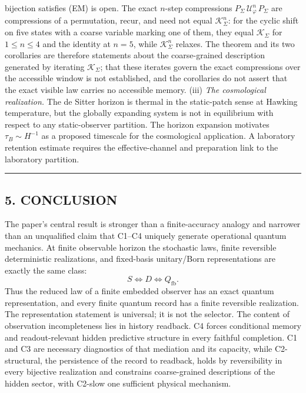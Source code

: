 \documentclass[
]{article}
\begin{document}
bijection satisfies (EM) is open. The exact \(n\)-step compressions
\(P_\Sigma\, \mathcal{U}_\varphi^n\, P_\Sigma\) are compressions of a
permutation, recur, and need not equal \(\mathcal{K}_\Sigma^n\): for the
cyclic shift on five states with a coarse variable marking one of them,
they equal \(\mathcal{K}_\Sigma\) for \(1 \leq n \leq 4\) and the
identity at \(n = 5\), while \(\mathcal{K}_\Sigma^n\) relaxes. The
theorem and its two corollaries are therefore statements about the
coarse-grained description generated by iterating
\(\mathcal{K}_\Sigma\); that these iterates govern the exact
compressions over the accessible window is not established, and the
corollaries do not assert that the exact visible law carries no
accessible memory. (iii) \emph{The cosmological realization.} The de
Sitter horizon is thermal in the static-patch sense at Hawking
temperature, but the globally expanding system is not in equilibrium
with respect to any static-observer partition. The horizon expansion
motivates \(\tau_B \sim H^{-1}\) as a proposed timescale for the
cosmological application. A laboratory retention estimate requires the
effective-channel and preparation link to the laboratory partition.

\begin{center}\rule{0.5\linewidth}{0.5pt}\end{center}

\hypertarget{conclusion}{%
\subsection{5. CONCLUSION}\label{conclusion}}

The paper's central result is stronger than a finite-accuracy analogy
and narrower than an unqualified claim that C1--C4 uniquely generate
operational quantum mechanics. At finite observable horizon the
stochastic laws, finite reversible deterministic realizations, and
fixed-basis unitary/Born representations are exactly the same class: \[
S\iff D\iff Q_{\mathrm{fb}}.
\] Thus the reduced law of a finite embedded observer has an exact
quantum representation, and every finite quantum record has a finite
reversible realization. The representation statement is universal; it is
not the selector. The content of observation incompleteness lies in
history readback. C4 forces conditional memory and readout-relevant
hidden predictive structure in every faithful completion. C1 and C3 are
necessary diagnostics of that mediation and its capacity, while
C2-structural, the persistence of the record to readback, holds by
reversibility in every bijective realization and constrains
coarse-grained descriptions of the hidden sector, with C2-slow one
sufficient physical mechanism.
\end{document}
